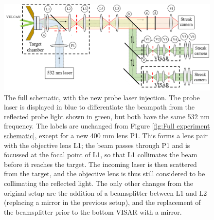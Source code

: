 \begin{figure}
\begin{centering}
\includegraphics[width=1.0\textwidth]{figures/Experiment/Full experiment schematic new laser injection.png}%
\caption{\label{fig:Full experiment schematic with new laser setup} The full schematic, with the new probe laser injection. The probe laser is displayed in blue to differentiate the beampath from the reflected probe light shown in green, but both have the same 532 nm frequency. The labels are unchanged from Figure \ref{fig:Full experiment schematic}, except for a new 400 mm lens P1. This forms a lens pair with the objective lens L1; the beam passes through P1 and is focussed at the focal point of L1, so that L1 collimates the beam before it reaches the target. The incoming laser is then scattered from the target, and the objective lens is thus still considered to be collimating the reflected light. The only other changes from the original setup are the addition of a beamsplitter between L1 and L2 (replacing a mirror in the previous setup), and the replacement of the beamsplitter prior to the bottom VISAR with a mirror.}
\end{centering}
\end{figure}


